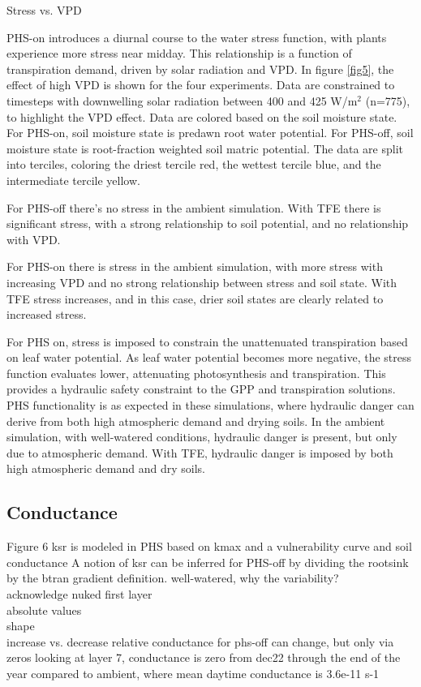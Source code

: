 \documentclass[draft,linenumbers]{agujournal}
\begin{document}
Stress vs. VPD

PHS-on introduces a diurnal course to the water stress function, with plants experience more stress near midday. This relationship is a function of transpiration demand, driven by solar radiation and VPD. In figure \ref{fig5}, the effect of high VPD is shown for the four experiments. Data are constrained to timesteps with downwelling solar radiation between 400 and 425 W/m$^2$ (n=775), to highlight the VPD effect. Data are colored based on the soil moisture state. For PHS-on, soil moisture state is predawn root water potential. For PHS-off, soil moisture state is root-fraction weighted soil matric potential. The data are split into terciles, coloring the driest tercile red, the wettest tercile blue, and the intermediate tercile yellow.

For PHS-off there's no stress in the ambient simulation. 
With TFE there is significant stress, with a strong relationship to soil potential, and no relationship with VPD. 

For PHS-on there is stress in the ambient simulation, with more stress with increasing VPD
and no strong relationship between stress and soil state.
With TFE stress increases, and in this case, drier soil states are clearly related to increased stress.

For PHS on, stress is imposed to constrain the unattenuated transpiration based on leaf water potential. 
As leaf water potential becomes more negative, the stress function evaluates lower, attenuating photosynthesis and transpiration.
This provides a hydraulic safety constraint to the GPP and transpiration solutions.
PHS functionality is as expected in these simulations, where hydraulic danger can derive from both high atmospheric demand and drying soils.
In the ambient simulation, with well-watered conditions, hydraulic danger is present, but only due to atmospheric demand. 
With TFE, hydraulic danger is imposed by both high atmospheric demand and dry soils.

\subsection{Conductance}
Figure 6
ksr is modeled in PHS based on kmax and a vulnerability curve and soil conductance
A notion of ksr can be inferred for PHS-off by dividing the rootsink by the btran gradient definition.
well-watered, why the variability?\\
acknowledge nuked first layer \\
absolute values \\
shape \\
increase vs. decrease
relative conductance for phs-off can change, but only via zeros
looking at layer 7, conductance is zero from dec22 through the end of the year
compared to ambient, where mean daytime conductance is 3.6e-11 s-1
\end{document}
